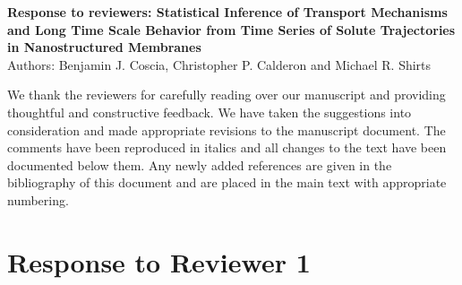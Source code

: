 \documentclass{article}
\begin{document}
\graphicspath{{./figures/}}

\begin{center}
\textbf{Response to reviewers: Statistical Inference of Transport Mechanisms and Long
        Time Scale Behavior from Time Series of Solute Trajectories in Nanostructured Membranes} \\
Authors: Benjamin J. Coscia, Christopher P. Calderon and Michael R. Shirts
\end{center}

We thank the reviewers for carefully reading over our manuscript and providing
thoughtful and constructive feedback. We have taken the suggestions into consideration 
and made appropriate revisions to the manuscript document. The comments have been reproduced
in italics and all changes to the text have been documented below them. Any newly added
references are given in the bibliography of this document and are placed in the main 
text with appropriate numbering.

\section*{Response to Reviewer 1}
\end{document}
